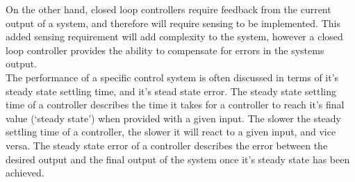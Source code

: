 On the other hand, closed loop controllers require feedback from the current output of a system, and therefore will require sensing to be implemented. This added sensing requirement will add complexity to the system, however a closed loop controller provides the ability to compensate for errors in the systems output.\\

The performance of a specific control system is often discussed in terms of it's steady state settling time, and it's stead state error. The steady state settling time of a controller describes the time it takes for a controller to reach it's final value (`steady state') when provided with a given input. The slower the steady settling time of a controller, the slower it will react to a given input, and vice versa. The steady state error of a controller describes the error between the desired output and the final output of the system once it's steady state has been achieved. 